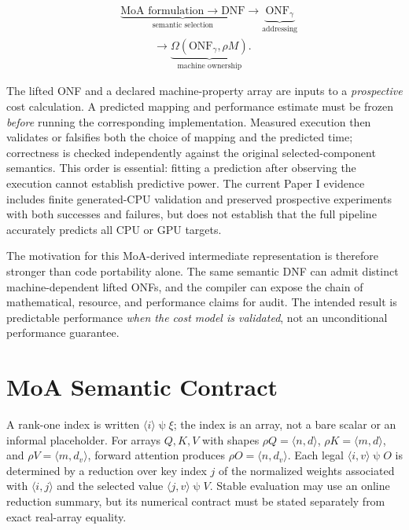 \documentclass[sigplan,10pt,review,anonymous,balance=false,pbalance=false]{acmart}
\newcommand{\ps}{\mathbin{\psi}}
\begin{document}
\begin{equation}\label{eq:research-chain}
\begin{aligned}
&\underbrace{\text{MoA formulation}\longrightarrow\mathrm{DNF}}_{\text{semantic selection}}
\longrightarrow\underbrace{\mathrm{ONF}_{\gamma}}_{\text{addressing}}\\
&\hspace{3em}\longrightarrow\underbrace{\Omega(\mathrm{ONF}_{\gamma},\rho M)}_{\text{machine ownership}}.
\end{aligned}
\end{equation}

The lifted ONF and a declared machine-property array are inputs to a \emph{prospective} cost calculation. A predicted mapping and performance estimate must be frozen \emph{before} running the corresponding implementation. Measured execution then validates or falsifies both the choice of mapping and the predicted time; correctness is checked independently against the original selected-component semantics. This order is essential: fitting a prediction after observing the execution cannot establish predictive power. The current Paper I evidence includes finite generated-CPU validation and preserved prospective experiments with both successes and failures, but does not establish that the full pipeline accurately predicts all CPU or GPU targets.

The motivation for this MoA-derived intermediate representation is therefore stronger than code portability alone. The same semantic DNF can admit distinct machine-dependent lifted ONFs, and the compiler can expose the chain of mathematical, resource, and performance claims for audit. The intended result is predictable performance \emph{when the cost model is validated}, not an unconditional performance guarantee.

\section{MoA Semantic Contract}
A rank-one index is written $\langle i\rangle\ps\xi$; the index is an array, not a bare scalar or an informal placeholder. For arrays $Q,K,V$ with shapes $\rho Q=\langle n,d\rangle$, $\rho K=\langle m,d\rangle$, and $\rho V=\langle m,d_v\rangle$, forward attention produces $\rho O=\langle n,d_v\rangle$. Each legal $\langle i,v\rangle\ps O$ is determined by a reduction over key index $j$ of the normalized weights associated with $\langle i,j\rangle$ and the selected value $\langle j,v\rangle\ps V$. Stable evaluation may use an online reduction summary, but its numerical contract must be stated separately from exact real-array equality.
\end{document}

